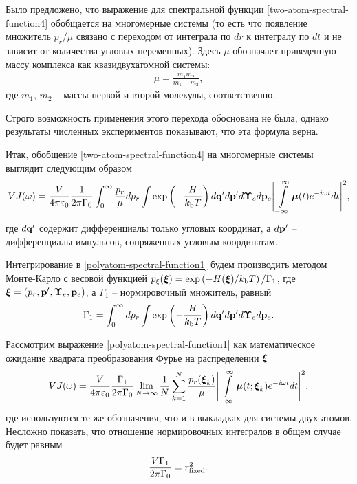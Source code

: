 Было предложено, что выражение для спектральной функции \eqref{two-atom-spectral-function4} обобщается на многомерные системы (то есть что появление множитель $p_r/ \mu$ связано с переходом от интеграла по $dr$ к интегралу по $dt$ и не зависит от количества угловых переменных). Здесь $\mu$ обозначает приведенную массу комплекса как квазидвухатомной системы:
\begin{gather}
    \mu = \frac{m_1 m_2}{m_1 + m_2},
\end{gather}
%
где $m_1$, $m_2$ -- массы первой и второй молекулы, соответственно. \par
Строго возможность применения этого перехода обоснована не была, однако результаты численных экспериментов показывают, что эта формула верна. \par
Итак, обобщение \eqref{two-atom-spectral-function4} на многомерные системы выглядит следующим образом
\begin{gather}
    V J(\omega) =  \frac{V}{4 \pi \varepsilon_0} \frac{1}{2\pi \Gamma_0}\int_0^\infty \frac{p_r}{\mu} dp_r \int \exp \left( -\frac{H}{k_\text{b} T} \right) d\mathbf{q}^\prime d\mathbf{p}^\prime d\boldsymbol{\Upsilon}_e d\mathbf{p}_e \Bigg\vert \int\limits_{-\infty}^\infty \boldsymbol{\mu}(t) e^{-i \omega t} dt \Bigg\vert^2, \label{polyatom-spectral-function1} 
\end{gather}
%
где $d\mathbf{q}^\prime$ содержит дифференциалы только угловых координат, а $d\mathbf{p}^\prime$ -- дифференциалы импульсов, сопряженных угловым координатам. \par
Интегрирование в \eqref{polyatom-spectral-function1} будем производить методом Монте-Карло с весовой функцией $p_\xi(\boldsymbol{\xi}) = \exp \left( - H(\boldsymbol{\xi})/k_\text{b} T \right) / \Gamma_1$, где $\boldsymbol{\xi} = \left( p_r, \mathbf{p}^\prime, \boldsymbol{\Upsilon}_e, \mathbf{p}_e \right)$, а $\Gamma_1$ -- нормировочный множитель, равный
\begin{gather}
    \Gamma_1 = \int_0^\infty dp_r \int \exp \left( -\frac{H}{k_\text{b} T} \right) d\mathbf{q}^\prime d\mathbf{p}^\prime d\boldsymbol{\Upsilon}_e d\mathbf{p}_e.
\end{gather}

Рассмотрим выражение \eqref{polyatom-spectral-function1} как математическое ожидание квадрата преобразования Фурье на распределении $\boldsymbol{\xi}$
\begin{gather}
    VJ(\omega) = \frac{V}{4 \pi \varepsilon_0} \frac{\Gamma_1}{2 \pi \Gamma_0} \lim_{N \rightarrow \infty} \frac{1}{N} \sum_{k = 1}^N \frac{p_r(\boldsymbol{\xi}_k)}{\mu} \Bigg\vert \int\limits_{-\infty}^\infty \boldsymbol{\mu}(t; \boldsymbol{\xi}_k) e^{-i \omega t} dt \Bigg\vert^2,
\end{gather}
%
где используются те же обозначения, что и в выкладках для системы двух атомов. Несложно показать, что отношение нормировочных интегралов в общем случае будет равным
\begin{gather}
    \frac{V \Gamma_1}{2 \pi \Gamma_0} = r_\text{fixed}^2.
\end{gather}

